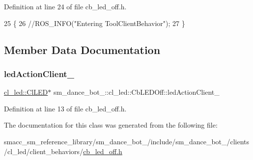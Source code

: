 Definition at line 24 of file cb\+\_\+led\+\_\+off.\+h.


\begin{DoxyCode}
25   \{
26     \textcolor{comment}{//ROS\_INFO("Entering ToolClientBehavior");}
27   \}
\end{DoxyCode}


\subsection{Member Data Documentation}
\mbox{\label{classsm__dance__bot__2_1_1cl__led_1_1CbLEDOff_a569146280ebdd71aa5b8f3268eb028bc}} 
\subsubsection{\texorpdfstring{led\+Action\+Client\+\_\+}{ledActionClient\_}}
{\footnotesize\ttfamily \hyperlink{classsm__dance__bot__2_1_1cl__led_1_1ClLED}{cl\+\_\+led\+::\+Cl\+L\+ED}$\ast$ sm\+\_\+dance\+\_\+bot\+\_\+::cl\+\_\+led\+::\+Cb\+L\+E\+D\+Off\+::led\+Action\+Client\+\_\+}



Definition at line 13 of file cb\+\_\+led\+\_\+off.\+h.



The documentation for this class was generated from the following file\+:\begin{DoxyCompactItemize}
\item 
smacc\+\_\+sm\+\_\+reference\+\_\+library/sm\+\_\+dance\+\_\+bot\+\_/include/sm\+\_\+dance\+\_\+bot\+\_/clients/cl\+\_\+led/client\+\_\+behaviors/\hyperlink{2_2include_2sm__dance__bot__2_2clients_2cl__led_2client__behaviors_2cb__led__off_8h}{cb\+\_\+led\+\_\+off.\+h}\end{DoxyCompactItemize}
